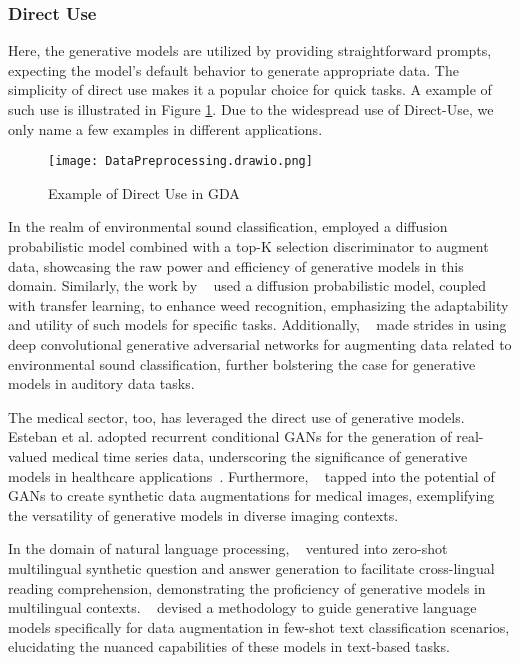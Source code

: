 \documentclass[preprint,12pt,authoryear]{elsarticle}
\begin{document}
\subsubsection{Direct Use}
Here, the generative models are utilized by providing straightforward prompts, expecting the model's default behavior to generate appropriate data. The simplicity of direct use makes it a popular choice for quick tasks. A example of such use is illustrated in Figure \ref{fig:direct_use}. Due to the widespread use of Direct-Use, we only name a few examples in different applications.

\begin{figure}
    \centering
    \centerline{\texttt{[image: DataPreprocessing.drawio.png]}}
    \caption{Example of Direct Use in GDA\cite{103_direct_use} }
    \label{fig:direct_use}
\end{figure}


 In the realm of environmental sound classification, \cite{103_direct_use} employed a diffusion probabilistic model combined with a top-K selection discriminator to augment data, showcasing the raw power and efficiency of generative models in this domain. Similarly, the work by ~\cite{104_direct_use} used a diffusion probabilistic model, coupled with transfer learning, to enhance weed recognition, emphasizing the adaptability and utility of such models for specific tasks. Additionally, ~\cite{105_direct_use} made strides in using deep convolutional generative adversarial networks for augmenting data related to environmental sound classification, further bolstering the case for generative models in auditory data tasks.

The medical sector, too, has leveraged the direct use of generative models. Esteban et al. adopted recurrent conditional GANs for the generation of real-valued medical time series data, underscoring the significance of generative models in healthcare applications~\cite{106_direct_use_medical}. Furthermore, ~\cite{107_direct_use_medical} tapped into the potential of GANs to create synthetic data augmentations for medical images, exemplifying the versatility of generative models in diverse imaging contexts.

In the domain of natural language processing, ~\cite{108_direct_use_QA} ventured into zero-shot multilingual synthetic question and answer generation to facilitate cross-lingual reading comprehension, demonstrating the proficiency of generative models in multilingual contexts. ~\cite{109_direct_use_few_shot} devised a methodology to guide generative language models specifically for data augmentation in few-shot text classification scenarios, elucidating the nuanced capabilities of these models in text-based tasks.
\end{document}
